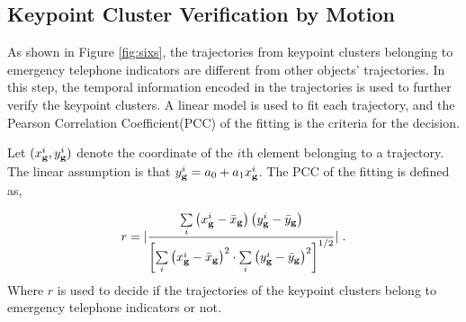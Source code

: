 \subsection{Keypoint Cluster Verification by Motion}

As shown in Figure \ref{fig:sixs}, the trajectories from keypoint clusters belonging to emergency telephone indicators are different from other objects' trajectories. In this step, the temporal information encoded in the trajectories is used to further verify the keypoint clusters. A linear model is used to fit each trajectory, and the Pearson Correlation Coefficient(PCC) of the fitting is the criteria for the decision.

Let $(x^i_{\bf{g}},y^i_{\bf{g}})$ denote the coordinate of the $i$th element belonging to a trajectory. The linear assumption is that $y^i_{\bf{g}}=a_0+a_1{x^i_{\bf{g}}}$. The PCC of the fitting is defined as,

\begin{equation}
r =| \frac{{\sum\limits_i {\left( {{x^i_{\bf{g}}} -  {\bar x_{\bf{g}}}} \right)\left( {{y^i_{\bf{g}}} -  {\bar y_{\bf{g}}}} \right)} }}{{{{\left[ {\sum\limits_i {{{\left( {{x^i_{\bf{g}}} -  {\bar x_{\bf{g}}}} \right)}^2} \cdot \sum\limits_i {{{\left( {{y^i_{\bf{g}}} -  {\bar y_{\bf{g}}}} \right)}^2}} } } \right]}^{1/2}}}}|\;.
\label{eq4}
\end{equation}
Where $r$ is used to decide if the trajectories of the keypoint clusters belong to emergency telephone indicators or not.

